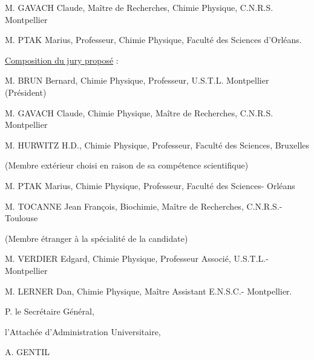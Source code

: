 M. GAVACH Claude, Maître de Recherches, Chimie Physique, C.N.R.S. Montpellier

M. PTAK Marius, Professeur, Chimie Physique, Faculté des Sciences d'Orléans.

\uline{Composition du jury proposé} :

M. BRUN Bernard, Chimie Physique, Professeur, U.S.T.L. Montpellier (Président)

M. GAVACH Claude, Chimie Physique, Maître de Recherches, C.N.R.S. Montpellier

M. HURWITZ H.D., Chimie Physique, Professeur, Faculté des Sciences, Bruxelles

(Membre extérieur choisi en raison de sa compétence scientifique)

M. PTAK Marius, Chimie Physique, Professeur, Faculté des Sciences- Orléans

M. TOCANNE Jean François, Biochimie, Maître de Recherches, C.N.R.S.- Toulouse

(Membre étranger à la spécialité de la candidate)

M. VERDIER Edgard, Chimie Physique, Professeur Associé, U.S.T.L.- Montpellier

M. LERNER Dan, Chimie Physique, Maître Assistant E.N.S.C.- Montpellier.

P. le Secrétaire Général,

l'Attachée d'Administration Universitaire,


A. GENTIL
